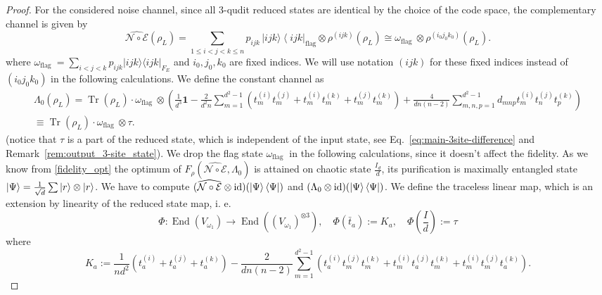 \documentclass[11pt,letterpaper]{article}
\theoremstyle{plain}
\theoremstyle{plain}
\theoremstyle{plain}
\theoremstyle{plain}
\theoremstyle{plain}
\theoremstyle{plain}
\theoremstyle{plain}
\theoremstyle{definition}
\theoremstyle{plain}
\begin{document}
\begin{proof}
    For the considered noise channel, since all $3$-qudit reduced states are identical by the choice of the code space, the complementary channel is given by
    \[
        \widehat{\mathcal{N} \circ \mathcal{E}}\left(\rho_L\right)= \sum_{1 \leq i<j<k \leq n} p_{i j k}\,|i j k\rangle\left\langle i j k\right|_{\text{flag}} \otimes \rho^{(ijk)}\left(\rho_L\right)\cong \omega_{\text{flag }} \otimes \rho^{(i_0j_0k_0)}\left(\rho_L\right).
    \]
    where $\omega_{\text {flag }}=\sum_{i<j<k} p_{i j k}|i j k\rangle\langle i j k|_{F_E}$ and $i_0, j_0, k_0$ are fixed indices. We will use notation $(i j k)$ for these fixed indices instead of $(i_0 j_0 k_0)$ in the following calculations.
    We define the constant channel as
    \begin{equation}\label{eq:constant_channel_3site}
        \begin{gathered}
            \Lambda_0(\rho_L)=\operatorname{Tr}(\rho_L)\cdot\omega_{\text{flag }} \otimes \left(\frac{1}{d^3} \mathbf{1}-\frac{2}{d^2 n} \sum_{m=1}^{d^2-1}\left(t_m^{(i)} t_m^{(j)}+t_m^{(i)} t_m^{(k)}+t_m^{(j)} t_m^{(k)}\right)+\frac{4}{d n(n-2)} \sum_{m, n, p=1}^{d^2-1} d_{m n p} t_m^{(i)} t_n^{(j)} t_p^{(k)}\right)\\\equiv \operatorname{Tr}(\rho_L)\cdot \omega_{\text{flag }} \otimes \tau.
        \end{gathered}
    \end{equation}
    (notice that $\tau$ is a part of the reduced state, which is independent of the input state, see Eq.~\eqref{eq:main-3site-difference} and Remark~\ref{rem:output_3-site_state}). We drop the flag state $\omega_{\text{flag }}$ in the following calculations, since it doesn't affect the fidelity.
    As we know from \ref{fidelity_opt} the optimum of $F_{\rho}(\widehat{\mathcal{N} \circ \mathcal{E}}, \Lambda_0)$ is attained on chaotic state $\frac{I_d}{d}$, its purification is maximally entangled state $\ket{\Psi}=\frac{1}{\sqrt{d}}\sum |r\rangle \otimes|r\rangle $. We have to compute $(\widehat{\mathcal{N} \circ \mathcal{E}} \otimes \mathrm{id})(\ket{\Psi}\bra{\Psi})$ and $(\Lambda_0 \otimes \mathrm{id})(\ket{\Psi}\bra{\Psi})$.
    We define the traceless linear map, which is an extension by linearity of the reduced state map, i. e.
    \[
        \Phi:  \operatorname{End}\left(V_{\omega_1}\right) \rightarrow \operatorname{End}\left(\left(V_{\omega_1}\right)^{\otimes 3}\right), \quad \Phi\left(\bar{t}_a\right):=K_a, \quad\Phi\left(\frac{I}{d}\right):=\tau
    \]
    where
    \[
        K_a:=\frac{1}{n d^2}\left(t_a^{(i)}+t_a^{(j)}+t_a^{(k)}\right)-\frac{2}{d n(n-2)} \sum_{m=1}^{d^2-1}\left(t_a^{(i)} t_m^{(j)} t_m^{(k)}+t_m^{(i)} t_a^{(j)} t_m^{(k)}+t_m^{(i)} t_m^{(j)} t_a^{(k)}\right).
\]
\end{proof}
\end{document}
